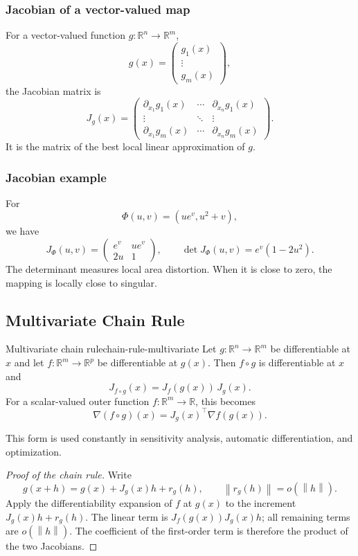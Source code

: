 \documentclass[11pt]{article}
\newcommand{\R}{\mathbb{R}}
\newcommand{\norm}[1]{\left\lVert #1\right\rVert}
\theoremstyle{definition}
\theoremstyle{plain}
\theoremstyle{remark}
\begin{document}
\subsubsection*{Jacobian of a vector-valued map}

For a vector-valued function $g:\R^n\to\R^m$,
\[
g(x)=
\begin{pmatrix}
g_1(x)\\
\vdots\\
g_m(x)
\end{pmatrix},
\]
the Jacobian matrix is
\[
J_g(x)=
\begin{pmatrix}
\partial_{x_1}g_1(x)&\cdots&\partial_{x_n}g_1(x)\\
\vdots&\ddots&\vdots\\
\partial_{x_1}g_m(x)&\cdots&\partial_{x_n}g_m(x)
\end{pmatrix}.
\]
It is the matrix of the best local linear approximation of $g$.

\subsubsection*{Jacobian example}

For
\[
\Phi(u,v)=(ue^v,u^2+v),
\]
we have
\[
J_\Phi(u,v)=
\begin{pmatrix}
e^v&ue^v\\
2u&1
\end{pmatrix},
\qquad
\det J_\Phi(u,v)=e^v(1-2u^2).
\]
The determinant measures local area distortion. When it is close to zero, the
mapping is locally close to singular.

\clearpage
\subsection{Multivariate Chain Rule}

\begin{keyproposition}{Multivariate chain rule}{chain-rule-multivariate}
Let $g:\R^n\to\R^m$ be differentiable at $x$ and let
$f:\R^m\to\R^p$ be differentiable at $g(x)$. Then $f\circ g$ is
differentiable at $x$ and
\[
\boxed{J_{f\circ g}(x)=J_f(g(x))\,J_g(x).}
\]
For a scalar-valued outer function $f:\R^m\to\R$, this becomes
\[
\boxed{\nabla(f\circ g)(x)=J_g(x)^\top\nabla f(g(x)).}
\]
\end{keyproposition}

This form is used constantly in sensitivity analysis, automatic
differentiation, and optimization.

\begin{proof}[Proof of the chain rule]
Write
\[
g(x+h)=g(x)+J_g(x)h+r_g(h),
\qquad \norm{r_g(h)}=o(\norm h).
\]
Apply the differentiability expansion of $f$ at $g(x)$ to the increment
$J_g(x)h+r_g(h)$. The linear term is
$J_f(g(x))J_g(x)h$; all remaining terms are $o(\norm h)$. The coefficient of
the first-order term is therefore the product of the two Jacobians.
\end{proof}
\end{document}
